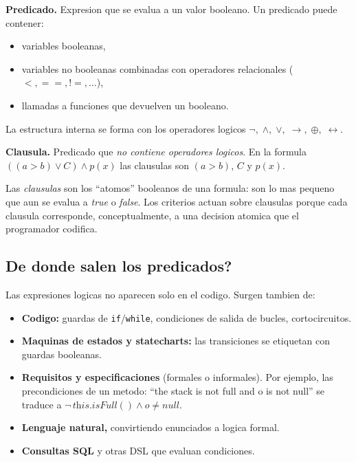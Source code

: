 \documentclass[12pt,a4paper]{article}
\begin{document}
\begin{definicionbox}
\textbf{Predicado.} Expresion que se evalua a un valor booleano. Un predicado puede contener:
\begin{itemize}
  \item variables booleanas,
  \item variables no booleanas combinadas con operadores relacionales ($<, ==, !=, \ldots$),
  \item llamadas a funciones que devuelven un booleano.
\end{itemize}
La estructura interna se forma con los operadores logicos
$\neg,\;\wedge,\;\vee,\;\rightarrow,\;\oplus,\;\leftrightarrow$.

\textbf{Clausula.} Predicado que \emph{no contiene operadores logicos}. En la formula
$((a > b) \vee C) \wedge p(x)$ las clausulas son $(a>b)$, $C$ y $p(x)$.
\end{definicionbox}

\begin{ideabox}
Las \emph{clausulas} son los ``atomos'' booleanos de una formula: son lo mas pequeno que aun se
evalua a \textit{true} o \textit{false}. Los criterios actuan sobre clausulas porque cada
clausula corresponde, conceptualmente, a una decision atomica que el programador codifica.
\end{ideabox}

\subsection{\textquestiondown{}De donde salen los predicados?}

Las expresiones logicas no aparecen solo en el codigo. Surgen tambien de:

\begin{itemize}
  \item \textbf{Codigo:} guardas de \texttt{if}/\texttt{while}, condiciones de salida de bucles,
  cortocircuitos.
  \item \textbf{Maquinas de estados y statecharts:} las transiciones se etiquetan con guardas
  booleanas.
  \item \textbf{Requisitos y especificaciones} (formales o informales). Por ejemplo, las
  precondiciones de un metodo: ``the stack is not full and o is not null'' se traduce a
  $\neg\,\textit{this.isFull}() \wedge o \ne \textit{null}$.
  \item \textbf{Lenguaje natural,} convirtiendo enunciados a logica formal.
  \item \textbf{Consultas SQL} y otras DSL que evaluan condiciones.
\end{itemize}
\end{document}
